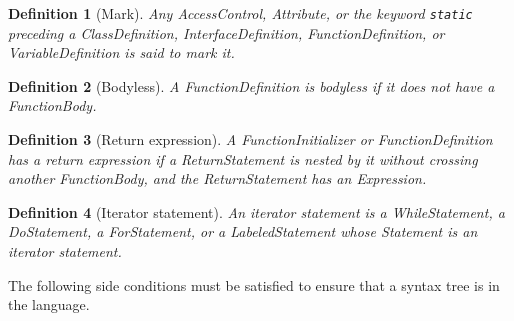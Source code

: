 \makeatletter{}\documentclass[10pt,oneside]{book}
\let\oldmarginpar\marginpar
\renewcommand\marginpar[1]{\-\oldmarginpar[\raggedleft\footnotesize #1]%
{\raggedright\footnotesize #1}}
\newcounter{parnum}[section]
\newcommand{\N}{\addtocounter{parnum}{1}\marginpar{\quad\arabic{chapter}.\arabic{section}(\arabic{parnum})}}
\newcommand{\nonterminal}[1]{{\slantsf #1}}
\theoremstyle{note}
\newtheorem{definition}{Definition}[section]
\begin{document}
\begin{definition}[Mark]\label{def:mark}
Any \nonterminal{AccessControl}, \nonterminal{Attribute}, or
the keyword \verb'static' preceding a \nonterminal{ClassDefinition},
\nonterminal{InterfaceDefinition}, \nonterminal{FunctionDefinition},
or \nonterminal{VariableDefinition} is said to \emph{mark} it.
\end{definition}

\begin{definition}[Bodyless]\label{def:bodyless}
A \nonterminal{FunctionDefinition} is \emph{bodyless} if it does not
have a  \nonterminal{FunctionBody}.
\end{definition}

\begin{definition}[Return expression]\label{def:return-expression}
A \nonterminal{FunctionInitializer} or \nonterminal{FunctionDefinition}
has a \emph{return expression} if a
\nonterminal{ReturnStatement} is nested by it without crossing
another \nonterminal{FunctionBody}, and the
\nonterminal{ReturnStatement} has an \nonterminal{Expression}.
\end{definition}

\begin{definition}[Iterator statement] An \emph{iterator} statement is
  a \nonterminal{WhileStatement}, a \nonterminal{DoStatement}, a
  \nonterminal{ForStatement}, or a 
  \nonterminal{LabeledStatement} whose \nonterminal{Statement} is an
  iterator statement.
\end{definition}

 
The following side conditions must be satisfied to ensure that a
syntax tree is in the language.




\end{document}
